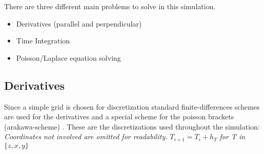 There are three different main problems to solve in this simulation.
\begin{itemize}
    \item Derivatives (parallel and perpendicular)
    \item Time Integration
    \item Poisson/Laplace equation solving
\end{itemize}

\subsection{Derivatives}
Since a simple grid is chosen for discretization standard finite-differences schemes are used for the derivatives and a special scheme for the poisson brackets (arakawa-scheme) \cite{arakawa}.\newline
These are the discretizations used throughout the simulation:\newline
\textit{Coordinates not involved are omitted for readability. $T_{i + 1} = T_i + h_T$ for T in $\{z, x, y\}$}
